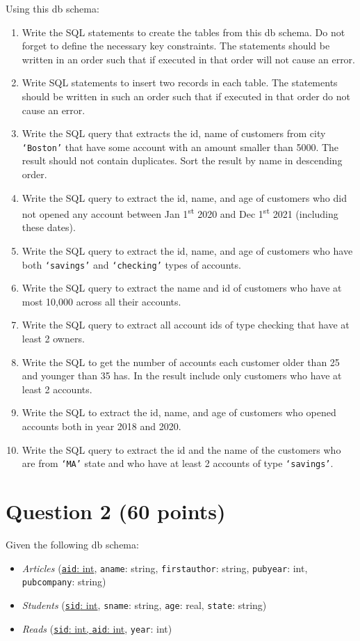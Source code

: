 \documentclass[letterpaper, 11pt]{article}
\begin{document}
Using this db schema:
\begin{enumerate}[label={\alph*}),leftmargin=*]
    \item Write the SQL statements to create the tables from this db schema. Do not forget to define the necessary key constraints. The statements should be written in an order such that if executed in that order will not cause an error.
    \item Write SQL statements to insert two records in each table. The statements should be written in such an order such that if executed in that order do not cause an error.
    \item Write the SQL query that extracts the id, name of customers from city \texttt{`Boston'} that have some account with an amount smaller than 5000.  The result should not contain duplicates. Sort the result by name in descending order.
    \item Write the SQL query to extract the id, name, and age of customers who did not opened any account between Jan 1\textsuperscript{st} 2020 and Dec 1\textsuperscript{st} 2021 (including these dates).
    \item Write the SQL query to extract the id, name, and age of customers who have both \texttt{`savings'} and \texttt{`checking'} types of accounts.
    \item Write the SQL query to extract the name and id of customers who have at most 10,000 across all their accounts.
    \item Write the SQL query to extract all account ids of type checking that have at least 2 owners.
    \item Write the SQL to get the number of accounts each customer older than 25 and younger than 35 has. In the result include only customers who have at least 2 accounts.
    \item Write the SQL to extract the id, name, and age of customers who opened accounts both in year 2018 and 2020.
    \item Write the SQL query to extract the id and the name of the customers who are from \texttt{`MA'} state and who have at least 2 accounts of type \texttt{`savings'}. 
\end{enumerate}

\section*{Question 2 (60 points)}

Given the following db schema:
\begin{itemize}
    \item \textit{Articles} (\ul{\texttt{aid}: int}, \texttt{aname}: string, \texttt{first\textunderscore author}: string, \texttt{pubyear}: int, \texttt{pubcompany}: string)
    \item \textit{Students} (\ul{\texttt{sid}: int}, \texttt{sname}: string, \texttt{age}: real, \texttt{state}: string)
    \item \textit{Reads} (\ul{\texttt{sid}: int, \texttt{aid}: int}, \texttt{year}: int) 
\end{itemize}
\end{document}
